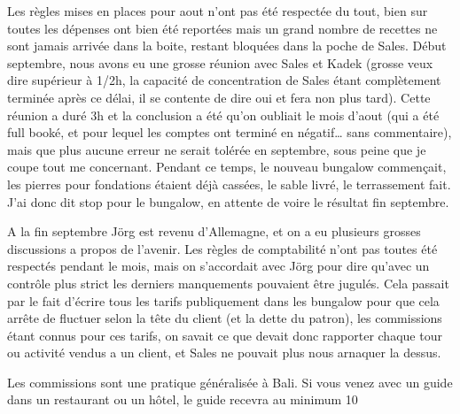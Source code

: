 \begin{multicols}{2}
Les règles mises en places pour aout n’ont pas été respectée du tout, bien sur toutes les dépenses ont bien été reportées mais un grand nombre de recettes ne sont jamais arrivée dans la boite, restant bloquées dans la poche de Sales. Début septembre, nous avons eu une grosse réunion avec Sales et Kadek (grosse veux dire supérieur à 1/2h, la capacité de concentration de Sales étant complètement terminée après ce délai, il se contente de dire oui et fera non plus tard). Cette réunion a duré 3h et la conclusion a été qu’on oubliait le mois d’aout (qui a été full booké, et pour lequel les comptes ont terminé en négatif… sans commentaire), mais que plus aucune erreur ne serait tolérée en septembre, sous peine que je coupe tout me concernant. Pendant ce temps, le nouveau bungalow commençait, les pierres pour fondations étaient déjà cassées, le sable livré, le terrassement fait. J’ai donc dit stop pour le bungalow, en attente de voire le résultat fin septembre.

A la fin septembre Jörg est revenu d’Allemagne, et on a eu plusieurs grosses discussions a propos de l’avenir. Les règles de comptabilité n’ont pas toutes été respectés pendant le mois, mais on s’accordait avec Jörg pour dire qu’avec un contrôle plus strict les derniers manquements pouvaient être jugulés. Cela passait par le fait d’écrire tous les tarifs publiquement dans les bungalow pour que cela arrête de fluctuer selon la tête du client (et la dette du patron), les commissions étant connus pour ces tarifs, on savait ce que devait donc rapporter chaque tour ou activité vendus a un client, et Sales ne pouvait plus nous arnaquer la dessus.

Les commissions sont une pratique généralisée à Bali. Si vous venez avec un guide dans un restaurant ou un hôtel, le guide recevra au minimum 10%


\end{multicols}
